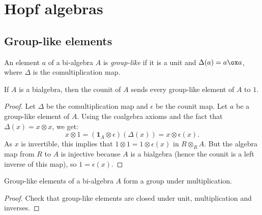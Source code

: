 \section{Hopf algebras}


\subsection{Group-like elements}


\begin{definition}
  \label{0-grp-like}
  \uses{}
  \leanok

  An element $a$ of a bi-algebra $A$ is \emph{group-like} if it is a unit and $\Delta(a) = a \ox a$, where $\Delta$ is the comultiplication map.
\end{definition}


\begin{lemma}
  \label{0-grp-like-counit}
  \leanok

  If $A$ is a bialgebra, then the counit of $A$ sends every group-like element of
  $A$ to $1$.
\end{lemma}
\begin{proof}
  \uses{}
  \leanok

  Let $\Delta$ be the comultiplication map and $\epsilon$ be the counit map.
  Let $a$ be a group-like element of $A$.
  Using the coalgebra axioms and the fact that $\Delta(x) = x\otimes x$, we get:
  \[x \otimes 1 = (\mathbf{1}_A\otimes\epsilon)(\Delta(x))= x \otimes\epsilon(x).\]
  As $x$ is invertible, this implies that $1\otimes 1 = 1\otimes\epsilon(x)$ in
  $R\otimes_R A$. But the algebra map from $R$ to $A$ is injective because $A$
  is a bialgebra (hence the counit is a left inverse of this map), so $1=\epsilon(x)$.
\end{proof}


\begin{proposition}
  \label{0-grp-like-grp}
  \leanok

  Group-like elements of a bi-algebra $A$ form a group under multiplication.
\end{proposition}
\begin{proof}
  \uses{}
  \leanok

  Check that group-like elements are closed under unit, multiplication and inverses.
\end{proof}


